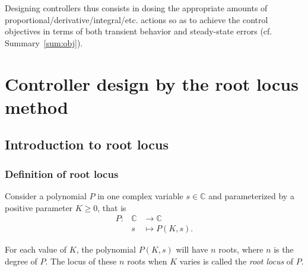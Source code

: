 \documentclass[a4paper,11pt]{report}
\theoremstyle{definition}
\newcommand{\bbC}{\mathbb{C}}
\begin{document}
Designing controllers thus consists in dosing the appropriate amounts
of proportional/derivative/integral/etc. actions so as to achieve the
control objectives in terms of both transient behavior and
steady-state errors (cf. Summary~\ref{sum:obj}).

\chapter{Controller design by the root locus method}
\label{chap:rl}

\section{Introduction to root locus}

\subsection{Definition of root locus}

Consider a polynomial $P$ in one complex variable $s\in\bbC$ and
parameterized by a positive parameter $K\geq 0$, that is
\begin{eqnarray}
  P :& \bbC & \rightarrow  \bbC  \nonumber \\
  & s & \mapsto  P(K,s). \nonumber
\end{eqnarray}

For each value of $K$, the polynomial $P(K,s)$ will have $n$ roots,
where $n$ is the degree of $P$. The locus of these $n$ roots when $K$
varies is called the \emph{root locus} of $P$.
\end{document}
